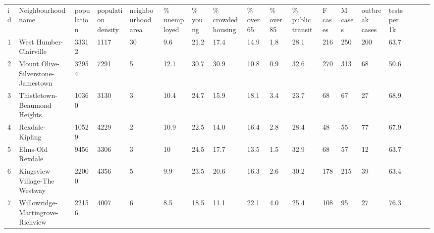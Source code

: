 \documentclass{article}
\begin{document}
    \begin{table}[h]
        \begin{adjustwidth}{-4cm}{-1cm}
            \begin{adjustbox}{width=580}
                \begin{tabular}{lllp{40pt}p{55pt}llp{35pt}llllllllll}
                    id & Neighbourhood name                  & population & population density & neighbourhood area & \% unemployed & \% young & \% crowded housing & \% over 65 & \% over 85 & \% public transit & F cases & M cases & outbreak cases & tests per 1k \\
                    1  & West Humber-Clairville              & 33312      & 1117               & 30                 & 9.6           & 21.2     & 17.4               & 14.9       & 1.8        & 28.1              & 216     & 250     & 200            & 63.7         \\
                    2  & Mount Olive-Silverstone-Jamestown   & 32954      & 7291               & 5                  & 12.1          & 30.7     & 30.9               & 10.8       & 0.9        & 32.6              & 270                  & 313                & 68                     & 50.6           \\
                    3  & Thistletown-Beaumond Heights        & 10360      & 3130               & 3                  & 10.4          & 24.7     & 15.9               & 18.1       & 3.4        & 23.7              & 68      & 67      & 27                     & 68.9           \\
                    4  & Rexdale-Kipling                     & 10529      & 4229               & 2                  & 10.9          & 22.5     & 14.0               & 16.4       & 2.8        & 28.4              & 48      & 55      & 77             & 67.9         \\
                    5  & Elms-Old Rexdale                    & 9456       & 3306               & 3                  & 10            & 24.5     & 17.7               & 13.5       & 1.5        & 32.9              & 68      & 57      & 12             & 63.7         \\
                    6  & Kingsview Village-The Westway       & 22000      & 4356               & 5                  & 9.9           & 23.5     & 20.6               & 16.3       & 2.6        & 30.2              & 178     & 215                & 39                     & 63.4           \\
                    7  & Willowridge-Martingrove-Richview    & 22156      & 4007               & 6                  & 8.5           & 18.5     & 11.1               & 22.1       & 4.0        & 25.4              & 108     & 95                 & 27                     & 76.3           \\

\end{tabular}
\end{adjustbox}
\end{adjustwidth}
\end{table}
\end{document}
